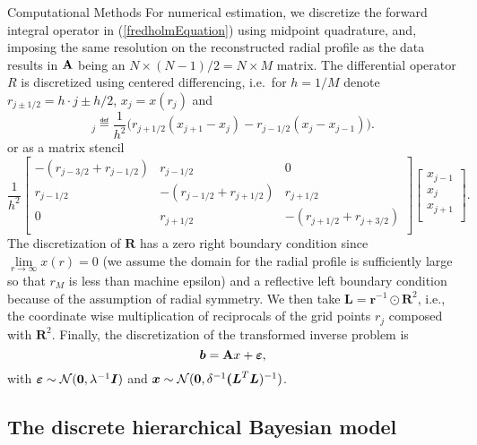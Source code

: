 \begin{chapter}{Computational Methods}
  For numerical estimation, we discretize the forward integral operator in (\ref{fredholmEquation}) using midpoint quadrature, and, imposing the same resolution on the reconstructed radial profile as the data results in ${\bf A}$ being an $N \times (N-1)/2 = N\times M$ matrix.
  The differential operator $R$ is discretized using centered differencing, i.e.~for $h = 1/M$ denote $r_{j\pm1/2} = h\cdot j \pm h/2$, $x_j = x(r_j)$ and
  \begin{equation}
    [\bm R \bm x]_j \eqdef \frac{1}{h^2} \Big( r_{j+1/2}(x_{j+1} - x_j) - r_{j-1/2}(x_{j} - x_{j-1})\Big).
    \label{laplacian_discretization}
  \end{equation}
  or as a matrix stencil
  \begin{equation}
    \frac{1}{h^2}
    \left[\begin{array}{ccc}
      -(r_{j-3/2} + r_{j-1/2}) & r_{j-1/2} & 0             \\
      r_{j-1/2} & -(r_{j-1/2} + r_{j+1/2}) & r_{j+1/2}     \\
      0 & r_{j+1/2} & -(r_{j+1/2} + r_{j+3/2}) \\
    \end{array}\right]
    \left[\begin{array}{c}
      x_{j-1} \\
      x_{j}   \\
      x_{j+1} \\
    \end{array}\right].
    \label{laplacian_discretization_stencil}
  \end{equation}
  The discretization of $\bm R$ has a zero right boundary condition since $\lim\limits_{r\to\infty}x(r) = 0$ (we assume the domain for the radial profile is sufficiently large so that $r_M$ is less than machine epsilon) and a reflective left boundary condition because of the assumption of radial symmetry.
  We then take $\bm L = \bm r^{-1} \odot \bm R^2$, i.e., the coordinate wise multiplication of reciprocals of the grid points $r_j$ composed with $\bm R^2$.
  Finally, the discretization of the transformed inverse problem is
  \begin{equation}\label{eq:psfDiscInvProblem}
    \mbox{\boldmath$b$} = {\bf A} x + \mbox{\boldmath$\varepsilon$},
  \end{equation}
  with $\mbox{\boldmath$\varepsilon$} \sim \mathcal{N}(\mbox{\boldmath$0$}, \lambda^{-1} \mbox{\boldmath$I$})$ and $\mbox{\boldmath$x$} \sim \mathcal{N}( \mbox{\boldmath$0$}, \delta^{-1} \mbox{\boldmath$($}\mbox{\boldmath$L$}^T\mbox{\boldmath$L$})^{-1})$.
  \subsection{The discrete hierarchical Bayesian model}

\end{chapter}

